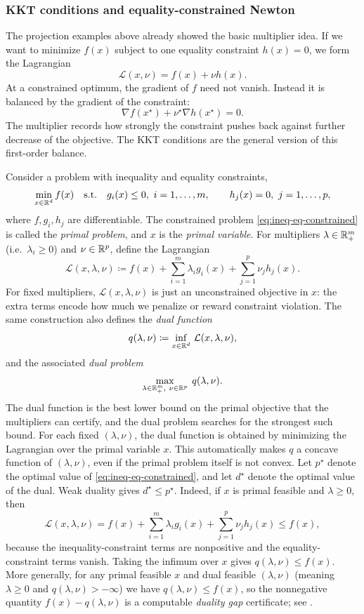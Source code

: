\subsubsection{KKT conditions and equality-constrained Newton}
\label{subsubsec:kkt}
\label{subsubsec:newton-equality-constraints}

The projection examples above already showed the basic multiplier idea.
If we want to minimize \(f(x)\) subject to one equality constraint \(h(x)=0\), we form the Lagrangian
\[
  \mathcal{L}(x,\nu)=f(x)+\nu h(x).
\]
At a constrained optimum, the gradient of \(f\) need not vanish.
Instead it is balanced by the gradient of the constraint:
\[
  \nabla f(x^\star)+\nu^\star \nabla h(x^\star)=0.
\]
The multiplier records how strongly the constraint pushes back against further decrease of the objective.
The KKT conditions are the general version of this first-order balance.

Consider a problem with inequality and equality constraints,
\begin{equation}
  \min_{x\in\mathbb{R}^d} f(x)
  \quad\text{s.t.}\quad
  g_i(x)\le 0,\ i=1,\dots,m,
  \qquad
  h_j(x)=0,\ j=1,\dots,p,
  \label{eq:ineq-eq-constrained}
\end{equation}
where $f,g_i,h_j$ are differentiable.
The constrained problem \eqref{eq:ineq-eq-constrained} is called the \emph{primal problem}, and \(x\) is the \emph{primal variable}.
For multipliers $\lambda\in\mathbb{R}_+^m$ (i.e.\ $\lambda_i\ge 0$) and $\nu\in\mathbb{R}^p$, define the Lagrangian
\[
  \mathcal{L}(x,\lambda,\nu)
  \coloneqq f(x) + \sum_{i=1}^m \lambda_i g_i(x) + \sum_{j=1}^p \nu_j h_j(x).
\]
For fixed multipliers, \(\mathcal{L}(x,\lambda,\nu)\) is just an unconstrained objective in \(x\): the extra terms encode how much we penalize or reward constraint violation.
The same construction also defines the \emph{dual function}
\[
  q(\lambda,\nu)\coloneqq \inf_{x\in\mathbb{R}^d}\,\mathcal{L}(x,\lambda,\nu),
\]
and the associated \emph{dual problem}
\[
  \max_{\lambda\in\mathbb{R}_+^m,\ \nu\in\mathbb{R}^p}\; q(\lambda,\nu).
\]
The dual function is the best lower bound on the primal objective that the multipliers can certify, and the dual problem searches for the strongest such bound.
For each fixed $(\lambda,\nu)$, the dual function is obtained by minimizing the Lagrangian over the primal variable \(x\).
This automatically makes $q$ a concave function of $(\lambda,\nu)$, even if the primal problem itself is not convex.
Let $p^\star$ denote the optimal value of \eqref{eq:ineq-eq-constrained}, and let $d^\star$ denote the optimal value of the dual.
Weak duality gives $d^\star\le p^\star$.
Indeed, if $x$ is primal feasible and $\lambda\ge 0$, then
\[
  \mathcal{L}(x,\lambda,\nu)
  = f(x) + \sum_{i=1}^m \lambda_i g_i(x) + \sum_{j=1}^p \nu_j h_j(x)
  \le f(x),
\]
because the inequality-constraint terms are nonpositive and the equality-constraint terms vanish.
Taking the infimum over $x$ gives $q(\lambda,\nu)\le f(x)$.
More generally, for any primal feasible $x$ and dual feasible $(\lambda,\nu)$ (meaning $\lambda\ge 0$ and $q(\lambda,\nu)>-\infty$) we have $q(\lambda,\nu)\le f(x)$, so the nonnegative quantity $f(x)-q(\lambda,\nu)$ is a computable \emph{duality gap} certificate; see \citet[\S5.1.2--\S5.1.3]{boyd_vandenberghe_2004_convex}.

